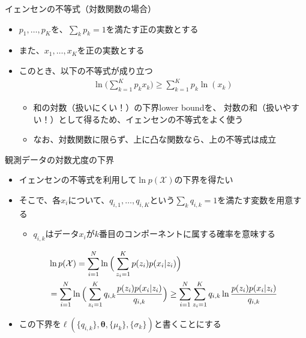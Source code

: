 \documentclass[aspectratio=169,unicode,dvipdfmx,14pt]{beamer}
\begin{document}
\begin{frame}{イェンセンの不等式（対数関数の場合）}
\begin{itemize}
\item $p_1,\ldots,p_K$を、$\sum_k p_k=1$を満たす正の実数とする
\item また、$x_1,\ldots, x_K$を正の実数とする
\item このとき、以下の不等式が成り立つ
\begin{align}
\ln \bigg( \sum_{k=1}^K p_k x_k \bigg) \geq \sum_{k=1}^K p_k \ln(x_k)
\end{align}
\begin{itemize}
\item 和の対数（扱いにくい！）の下界lower boundを、
対数の和（扱いやすい！）として得るため、イェンセンの不等式をよく使う
\item なお、対数関数に限らず、上に凸な関数なら、上の不等式は成立
\end{itemize}
\end{itemize}
\end{frame}

\begin{frame}{観測データの対数尤度の下界}
\begin{itemize}
\item イェンセンの不等式を利用して$\ln p(\mathcal{X})$の下界を得たい
\item そこで、各$x_i$について、$q_{i,1}, \ldots, q_{i,K}$という$\sum_k q_{i,k}=1$を満たす変数を用意する
\begin{itemize}
\item $q_{i,k}$はデータ$x_i$が$k$番目のコンポーネントに属する確率を意味する
\end{itemize}
\vspace{-.05in}
\begin{align}
& \ln p(\mathcal{X}) = \sum_{i=1}^N \ln \Big( \sum_{z_i=1}^K p(z_i) p(x_i | z_i) \Big)
\notag \\ & = \sum_{i=1}^N \ln \Big( \sum_{z_i=1}^K q_{i,k} \frac{p(z_i) p(x_i | z_i)}{q_{i,k}} \Big)
\geq 
\sum_{i=1}^N \sum_{z_i=1}^K q_{i,k} \ln\frac{p(z_i) p(x_i | z_i)}{q_{i,k}}
\end{align}
\vspace{-.4in}
\item この下界を$\ell(\{q_{i,k}\},\bm{\theta},\{\mu_k\},\{\sigma_k\})$と書くことにする
\end{itemize}
\end{frame}
\end{document}

